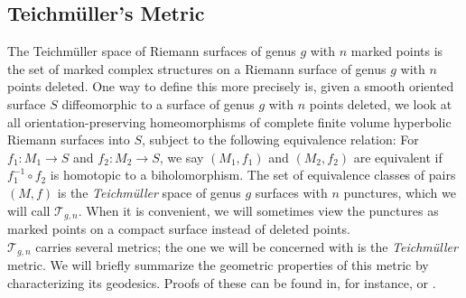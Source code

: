 \documentclass[12pt]{article}
\begin{document}
\subsection{Teichm\"uller's Metric}

\noindent The Teichm\"uller space of Riemann surfaces of genus $g$ with $n$ marked points is the set of marked complex structures on a Riemann surface of genus $g$ with $n$ points deleted. One way to define this more precisely is, given a smooth oriented surface $S$ diffeomorphic to a surface of genus $g$ with $n$ points deleted, we look at all orientation-preserving homeomorphisms of complete finite volume hyperbolic Riemann surfaces into $S$, subject to the following equivalence relation: For $f_1: M_1 \to S$ and $f_2: M_2 \to S$, we say $(M_1,f_1)$ and $(M_2,f_2)$ are equivalent if $f_1^{-1} \circ f_2$ is homotopic to a biholomorphism. The set of equivalence classes of pairs $(M,f)$ is the \emph{Teichm\"uller} space of genus $g$ surfaces with $n$ punctures, which we will call $\mathcal{T}_{g,n}$. When it is convenient, we will sometimes view the punctures as marked points on a compact surface instead of deleted points.\\

\noindent $\mathcal{T}_{g,n}$ carries several metrics; the one we will be concerned with is the \emph{Teichm\"uller} metric. We will briefly summarize the geometric properties of this metric by characterizing its geodesics. Proofs of these can be found in, for instance, \cite{Hubbard} or \cite{FarbMarg}.
\end{document}
